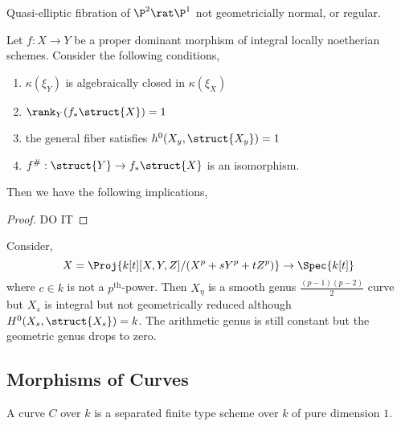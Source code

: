 \documentclass[12pt]{article}
\begin{document}
\begin{example}
Quasi-elliptic fibration of $\P^2 \rat \P^1$ not geometricially normal, or regular.
\end{example}


\begin{theorem}[Fujita 1982]
Let $f : X \to Y$ be a proper dominant morphism of integral locally noetherian schemes. Consider the following conditions,
\begin{enumerate}
\item $\kappa(\xi_Y)$ is algebraically closed in $\kappa(\xi_X)$

\item $\rank_Y (f_* \struct{X}) = 1$

\item the general fiber satisfies $h^0(X_y, \struct{X_y}) = 1$

\item $f^{\#} : \struct{Y} \to f_* \struct{X}$ is an isomorphism.
\end{enumerate}
Then we have the following implications,
\begin{center}
\end{center}
\end{theorem}

\begin{proof}
DO IT
\end{proof}

\begin{example}
Consider,
\[ X = \Proj{k[t][X,Y,Z]/(X^p + s Y^p + t Z^p)} \to \Spec{k[t]} \]
where $c \in k$ is not a $p^{\text{th}}$-power. Then $X_{\eta}$ is a smooth genus $\frac{(p-1)(p-2)}{2}$ curve but $X_s$ is integral but not geometrically reduced although $H^0(X_s, \struct{X_s}) = k$. The arithmetic genus is still constant but the geometric genus drops to zero.  
\end{example}

\subsection{Morphisms of Curves}


\begin{defn}
A curve $C$ over $k$ is a separated finite type scheme over $k$ of pure dimension $1$.
\end{defn}
\end{document}
